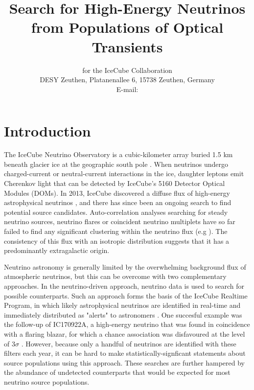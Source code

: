 \documentclass{PoS}
\title{Search for High-Energy Neutrinos from Populations of Optical Transients}
\author{\speaker{Robert Stein} for the IceCube Collaboration\\
        DESY Zeuthen, Platanenallee 6, 15738 Zeuthen, Germany\\
        E-mail: \email{robert.stein@desy.de}}
\begin{document}
	
\section{Introduction}

The IceCube Neutrino Observatory is a cubic-kilometer array buried 1.5 km beneath glacier ice at the geographic south pole \cite{Aartsen:2016nxy}. When neutrinos undergo charged-current  or neutral-current interactions in the ice, daughter leptons emit Cherenkov light that can be detected by IceCube's 5160 Detector Optical Modules (DOMs). In 2013, IceCube discovered a diffuse flux of high-energy astrophysical neutrinos \cite{Aartsen:2013jdh}, and there has since been an ongoing search to find potential source candidates. Auto-correlation analyses searching for steady neutrino sources, neutrino flares or coincident neutrino multiplets have so far failed to find any significant clustering within the neutrino flux (e.g  \cite{Aartsen:2016oji}). The consistency of this flux with an isotropic distribution suggests that it has a predominantly extragalactic origin. 

 Neutrino astronomy is generally limited by the overwhelming background flux of atmospheric neutrinos, but this can be overcome with two complementary approaches. In the neutrino-driven approach, neutrino data is used to search for possible counterparts. Such an approach forms the basis of the IceCube Realtime Program, in which likely astrophysical neutrinos are identified in real-time and immediately distributed as "alerts" to astronomers \cite{Aartsen:2016lmt}. One succesful example was the follow-up of IC170922A, a high-energy neutrino that was found in coincidence with a flaring blazar, for which a chance association was disfavoured at the level of 3$\sigma$ \cite{IceCube:2018dnn}. However, because only a handful of neutrinos are identified with these filters each year, it can be hard to make statistically-signficant statements about source populations using this approach. These searches are further hampered by the abundance of undetected counterparts that would be expected for most neutrino source populations.
\end{document}
